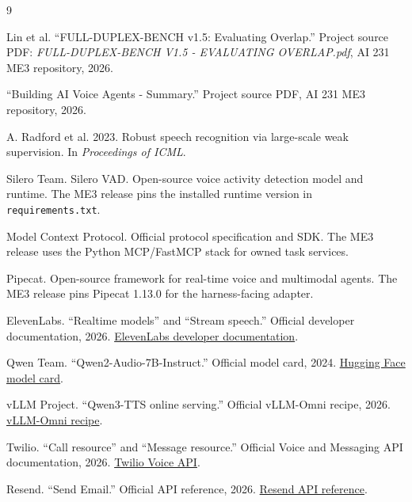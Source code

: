 \documentclass[sigconf,nonacm]{acmart}
\begin{document}
\begin{thebibliography}{9}

Lin et al. ``FULL-DUPLEX-BENCH v1.5: Evaluating Overlap.''
Project source PDF: \textit{FULL-DUPLEX-BENCH V1.5 - EVALUATING OVERLAP.pdf},
AI 231 ME3 repository, 2026.

``Building AI Voice Agents - Summary.'' Project source PDF, AI 231 ME3
repository, 2026.

A. Radford et al. 2023. Robust speech recognition via large-scale weak
supervision. In \textit{Proceedings of ICML}.

Silero Team. Silero VAD. Open-source voice activity detection model and
runtime. The ME3 release pins the installed runtime version in
\texttt{requirements.txt}.

Model Context Protocol. Official protocol specification and SDK. The ME3
release uses the Python MCP/FastMCP stack for owned task services.

Pipecat. Open-source framework for real-time voice and multimodal agents. The
ME3 release pins Pipecat 1.13.0 for the harness-facing adapter.

ElevenLabs. ``Realtime models'' and ``Stream speech.'' Official developer
documentation, 2026. \href{https://elevenlabs.io/docs/eleven-agents/customization/realtime-models}{ElevenLabs developer documentation}.

Qwen Team. ``Qwen2-Audio-7B-Instruct.'' Official model card, 2024.
\href{https://huggingface.co/Qwen/Qwen2-Audio-7B-Instruct}{Hugging Face model card}.

vLLM Project. ``Qwen3-TTS online serving.'' Official vLLM-Omni recipe, 2026.
\href{https://github.com/vllm/vllm-omni/blob/main/recipes/Qwen/Qwen3-TTS.md}{vLLM-Omni recipe}.

Twilio. ``Call resource'' and ``Message resource.'' Official Voice and
Messaging API documentation, 2026.
\href{https://www.twilio.com/docs/voice/api/call-resource}{Twilio Voice API}.

Resend. ``Send Email.'' Official API reference, 2026.
\href{https://resend.com/docs/api-reference/emails/send-email}{Resend API reference}.

\end{thebibliography}
\end{document}

